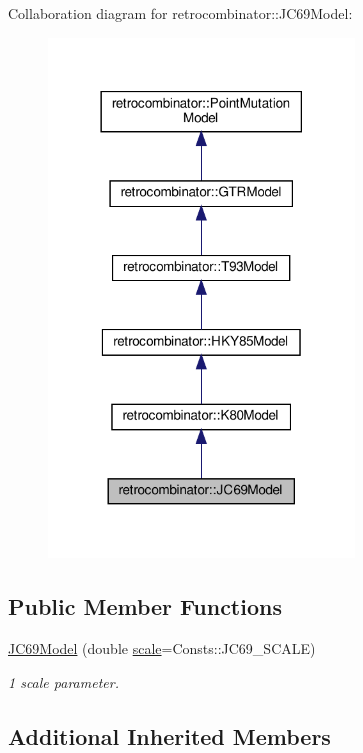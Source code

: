 Collaboration diagram for retrocombinator\+:\+:J\+C69\+Model\+:
\nopagebreak
\begin{figure}[H]
\begin{center}
\leavevmode
\includegraphics[width=230pt]{classretrocombinator_1_1JC69Model__coll__graph}
\end{center}
\end{figure}
\subsection*{Public Member Functions}
\begin{DoxyCompactItemize}
\item 
\hyperlink{classretrocombinator_1_1JC69Model_ab28021c22ed997738e2eac2f280930a5}{J\+C69\+Model} (double \hyperlink{classretrocombinator_1_1PointMutationModel_a3258dfbdae0f2614cdc66f13ae028b46}{scale}=Consts\+::\+J\+C69\+\_\+\+S\+C\+A\+LE)
\begin{DoxyCompactList}\small\item\em 1 scale parameter. \end{DoxyCompactList}\end{DoxyCompactItemize}
\subsection*{Additional Inherited Members}


